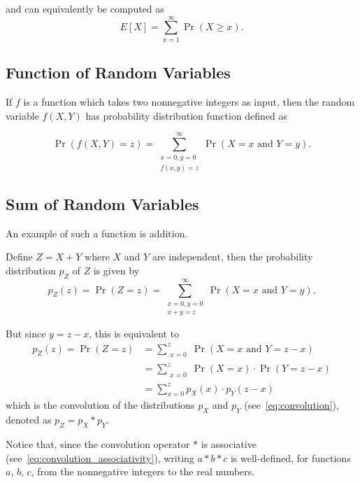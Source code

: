 \documentclass{masterthesis}
\begin{document}
and can equivalently be computed as 
\begin{equation}
    E[X] = \sum_{x=1}^{\infty} \Pr(X \geq x).
\end{equation}

\subsection*{Function of Random Variables}\label{paragraph:function_of_random_variables}
If $f$ is a function which takes two nonnegative integers as input, then the random variable $f(X, Y)$ has probability distribution function defined as

\begin{equation}
    \Pr(f(X, Y) = z) = \sum_{\substack{x=0, y=0 \\ f(x,y)=z}}^{\infty} \Pr(X = x \text{ and } Y = y).
\end{equation}

\subsection*{Sum of Random Variables}\label{paragraph:sum_of_random_variables}
An example of such a function is addition. 

Define $Z = X+Y$ where $X$ and $Y$ are independent, then the probability distribution $p_Z$ of $Z$ is given by 
\begin{equation}
    p_Z(z) = \Pr(Z = z) = \sum_{\substack{x=0, y=0 \\ x+y=z}}^{\infty} \Pr(X = x \text{ and } Y = y).
\end{equation}

But since $y = z - x$, this is equivalent to
\begin{align}
    p_Z(z) = \Pr(Z = z) &= \sum_{\substack{x=0}}^{z} \Pr(X = x \text{ and } Y = z - x) \\ 
                        &= \sum_{\substack{x=0}}^{z} \Pr(X = x) \cdot \Pr(Y = z - x) \\
                        &= \sum_{x=0}^{z} p_X(x) \cdot p_Y (z - x)
\end{align}
which is the convolution of the distributions $p_X$ and $p_Y$ (see~\ref{eq:convolution}), denoted as $p_Z = p_X * p_Y$.

Notice that, since the convolution operator $*$ is associative (see~\ref{eq:convolution_associativity}), writing $a * b * c$ is well-defined, for functions $a$, $b$, $c$, from the nonnegative integers to the real numbers.
\end{document}
